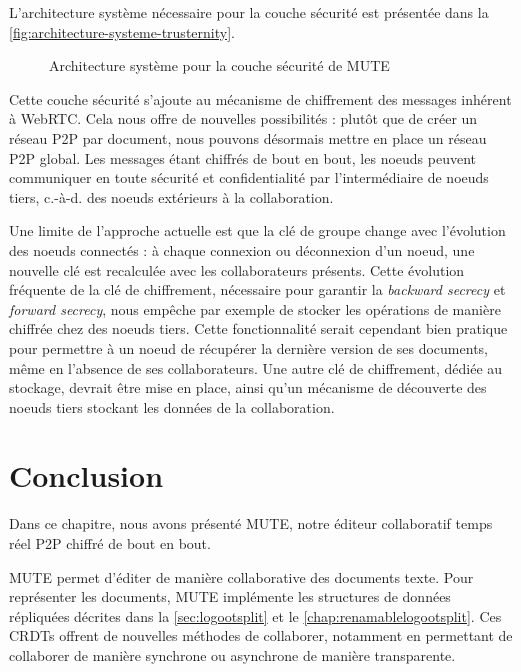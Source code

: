 \documentclass[12pt]{thesul}
\newcommand{\ie}{c.-à-d. }
\begin{document}
L'architecture système nécessaire pour la couche sécurité est présentée dans la \autoref{fig:architecture-systeme-trusternity}.

\begin{figure}[!ht]
  \caption{Architecture système pour la couche sécurité de MUTE}
  \label{fig:architecture-systeme-trusternity}
\end{figure}

Cette couche sécurité s'ajoute au mécanisme de chiffrement des messages inhérent à \ac{WebRTC}.
Cela nous offre de nouvelles possibilités : plutôt que de créer un réseau \ac{P2P} par document, nous pouvons désormais mettre en place un réseau \ac{P2P} global.
Les messages étant chiffrés de bout en bout, les noeuds peuvent communiquer en toute sécurité et confidentialité par l'intermédiaire de noeuds tiers, \ie des noeuds extérieurs à la collaboration.

Une limite de l'approche actuelle est que la clé de groupe change avec l'évolution des noeuds connectés : à chaque connexion ou déconnexion d'un noeud, une nouvelle clé est recalculée avec les collaborateurs présents.
Cette évolution fréquente de la clé de chiffrement, nécessaire pour garantir la \emph{backward secrecy} et \emph{forward secrecy}, nous empêche par exemple de stocker les opérations de manière chiffrée chez des noeuds tiers.
Cette fonctionnalité serait cependant bien pratique pour permettre à un noeud de récupérer la dernière version de ses documents, même en l'absence de ses collaborateurs.
Une autre clé de chiffrement, dédiée au stockage, devrait être mise en place, ainsi qu'un mécanisme de découverte des noeuds tiers stockant les données de la collaboration.


\section{Conclusion}

Dans ce chapitre, nous avons présenté \acf{MUTE}, notre éditeur collaboratif temps réel \ac{P2P} chiffré de bout en bout.

MUTE permet d'éditer de manière collaborative des documents texte.
Pour représenter les documents, MUTE implémente les structures de données répliquées décrites dans la \autoref{sec:logootsplit} et le \autoref{chap:renamablelogootsplit}.
Ces \acp{CRDT} offrent de nouvelles méthodes de collaborer, notamment en permettant de collaborer de manière synchrone ou asynchrone de manière transparente.
\end{document}
